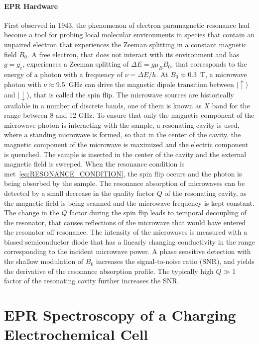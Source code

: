 \paragraph{EPR Hardware}
First observed in 1943, the phenomenon of electron paramagnetic resonance had become a tool for probing local molecular environments in species that contain an unpaired electron that experiences the Zeeman splitting in a constant magnetic field $B_0$. A free electron, that does not interact with its environment and has $g=g_e$, experiences a Zeeman splitting of $\Delta E = g \mu_B B_0$, that corresponds to the energy of a photon with a frequency of $\nu=\Delta E / h$. At $B_0\approx0.3$~T, a microwave photon with $\nu\approx9.5$~GHz can drive the magnetic dipole transition between $\vert{\uparrow\rangle}$ and $\vert{\downarrow\rangle}$, that is called the spin flip. The microwave sources are historically\cite{RADARS} available in a number of discrete bands, one of them is known as $X$ band for the range between 8 and 12 GHz. To ensure that only the magnetic component of the microwave photon is interacting with the sample, a resonating cavity is used, where a standing microwave is formed, so that in the center of the cavity, the magnetic component of the microwave is maximized and the electric component is quenched. The sample is inserted in the center of the cavity and the external magnetic field is sweeped. When the resonance condition is met~\ref{eq:RESONANCE_CONDITION}, the spin flip occurs and the photon is being absorbed by the sample. The resonance absorption of microwaves can be detected by a small decrease in the quality factor $Q$ of the resonating cavity, as the magnetic field is being scanned and the microwave frequency is kept constant. The change in the $Q$ factor during the spin flip leads to temporal decoupling of the resonator, that causes reflections of the microwave that would have entered the resonator off resonance. The intensity of the microwaves is measured with a biased semiconductor diode that has a linearly changing conductivity in the range corresponding to  the incident microwave power. A phase sensitive detection with the shallow modulation of $B_0$ increases the signal-to-noise ratio (SNR), and yields the derivative of the resonance absorption profile. The typically high $Q\gg1$ factor of the resonating cavity further increases the SNR.


\section{EPR Spectroscopy of a Charging Electrochemical Cell}

